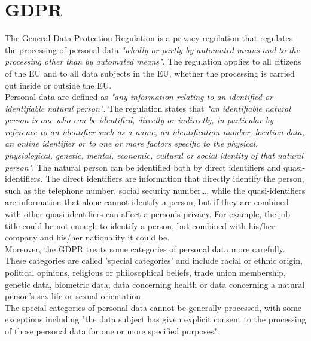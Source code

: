 \section{GDPR}
The General Data Protection Regulation\cite{european_commission_regulation_2016} is a privacy regulation that regulates the processing of personal data \textit{"wholly or partly by automated means and to the processing other than by automated means"}. The regulation applies to all citizens of the EU and to all data subjects in the EU, whether the processing is carried out inside or outside the EU. \\
Personal data are defined as \textit{"any information relating to an identified or identifiable natural person"}. The regulation states that \textit{"an identifiable natural person is one who can be identified, directly or indirectly, in particular by reference to an identifier such as a name, an identification number, location data, an online identifier or to one or more factors specific to the physical, physiological, genetic, mental, economic, cultural or social identity of that natural person"}. The natural person can be identified both by direct identifiers and quasi-identifiers. The direct identifiers are information that directly identify the person, such as the telephone number, social security number\dots, while the quasi-identifiers are information that alone cannot identify a person, but if they are combined with other quasi-identifiers can affect a person's privacy. For example, the job title could be not enough to identify a person, but combined with his/her company and his/her nationality it could be. \\
Moreover, the GDPR treats some categories of personal data more carefully. These categories are called 'special categories' and include racial or ethnic origin, political opinions, religious or philosophical beliefs, trade union membership, genetic data, biometric data, data concerning health or data concerning a natural person's sex life or sexual orientation \\
The special categories of personal data cannot be generally processed, with some exceptions including "the data subject has given explicit consent to the processing of those personal data for one or more specified purposes".\\

